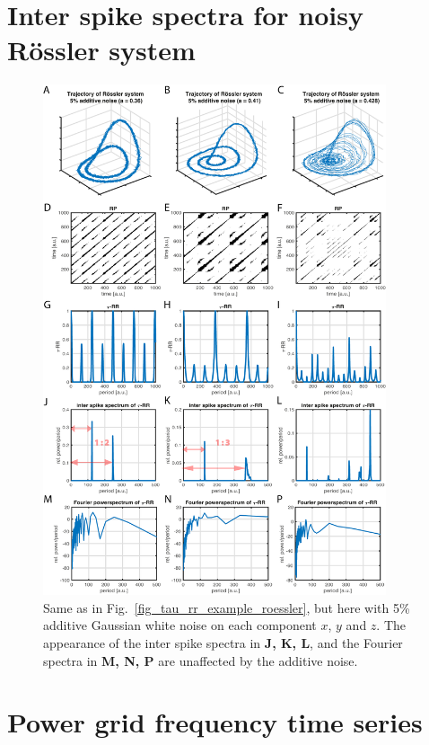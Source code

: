 \documentclass[entropy,article,submit,pdftex,moreauthors]{Definitions/mdpi}
\begin{document}
\section{Inter spike spectra for noisy R\"ossler system}

\begin{figure}[h!]
 \centering
 \includegraphics[width=0.9\textwidth]{./figures/fig_tau_rr_example_roessler_noise}
 \caption{Same as in Fig.~\ref{fig_tau_rr_example_roessler}, but here with 5\% additive Gaussian white noise on each component $x$, $y$ and $z$. The appearance of the inter spike spectra 
 in \textbf{J, K, L}, and the Fourier spectra in \textbf{M, N, P} are unaffected by the additive noise.}
\label{fig_tau_rr_example_roessler_noise}
\end{figure}

\section{Power grid frequency time series}\label{sec_power_grid_appendix}
\end{document}
